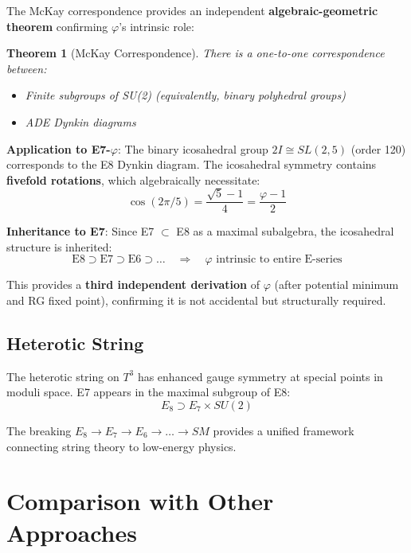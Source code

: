 \documentclass[11pt,a4paper]{article}
\newtheorem{theorem}{Theorem}
\begin{document}
The McKay correspondence provides an independent \textbf{algebraic-geometric theorem} confirming $\varphi$'s intrinsic role:

\begin{theorem}[McKay Correspondence]
There is a one-to-one correspondence between:
\begin{itemize}
\item Finite subgroups of SU(2) (equivalently, binary polyhedral groups)
\item ADE Dynkin diagrams
\end{itemize}
\end{theorem}

\textbf{Application to E7-$\varphi$}: The binary icosahedral group $2I \cong SL(2,5)$ (order 120) corresponds to the E8 Dynkin diagram. The icosahedral symmetry contains \textbf{fivefold rotations}, which algebraically necessitate:
\begin{equation}
\cos(2\pi/5) = \frac{\sqrt{5}-1}{4} = \frac{\varphi - 1}{2}
\end{equation}

\textbf{Inheritance to E7}: Since E7 $\subset$ E8 as a maximal subalgebra, the icosahedral structure is inherited:
\begin{equation}
\text{E8} \supset \text{E7} \supset \text{E6} \supset \ldots \quad \Rightarrow \quad \varphi \text{ intrinsic to entire E-series}
\end{equation}

This provides a \textbf{third independent derivation} of $\varphi$ (after potential minimum and RG fixed point), confirming it is not accidental but structurally required.

\subsection{Heterotic String}

The heterotic string on $T^3$ has enhanced gauge symmetry at special points in moduli space. E7 appears in the maximal subgroup of E8:
\begin{equation}
E_8 \supset E_7 \times SU(2)
\end{equation}

The breaking $E_8 \to E_7 \to E_6 \to \ldots \to SM$ provides a unified framework connecting string theory to low-energy physics.

\section{Comparison with Other Approaches}
\end{document}
